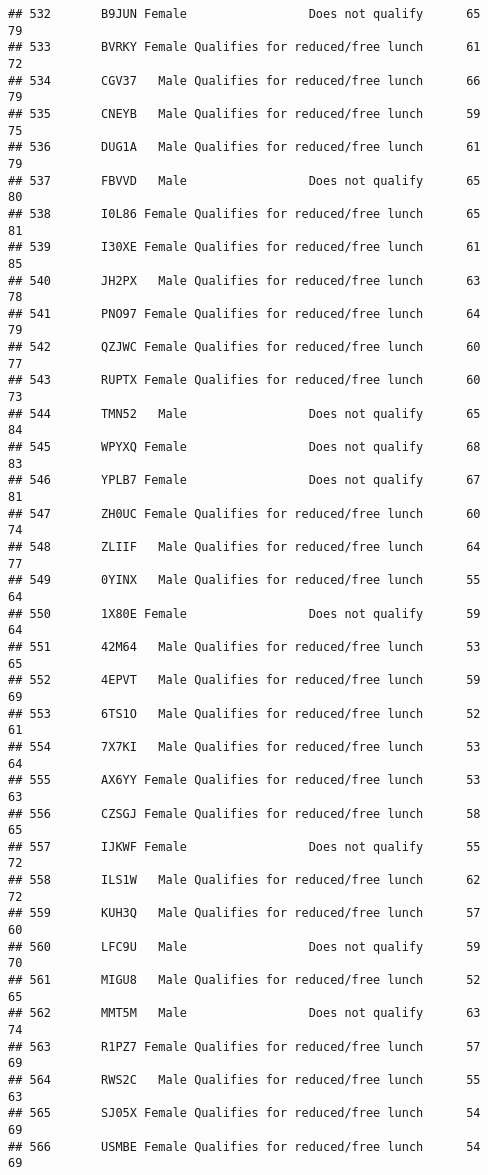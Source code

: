 \documentclass[
]{article}
\begin{document}
\begin{verbatim}
## 532       B9JUN Female                 Does not qualify      65       79
## 533       BVRKY Female Qualifies for reduced/free lunch      61       72
## 534       CGV37   Male Qualifies for reduced/free lunch      66       79
## 535       CNEYB   Male Qualifies for reduced/free lunch      59       75
## 536       DUG1A   Male Qualifies for reduced/free lunch      61       79
## 537       FBVVD   Male                 Does not qualify      65       80
## 538       I0L86 Female Qualifies for reduced/free lunch      65       81
## 539       I30XE Female Qualifies for reduced/free lunch      61       85
## 540       JH2PX   Male Qualifies for reduced/free lunch      63       78
## 541       PNO97 Female Qualifies for reduced/free lunch      64       79
## 542       QZJWC Female Qualifies for reduced/free lunch      60       77
## 543       RUPTX Female Qualifies for reduced/free lunch      60       73
## 544       TMN52   Male                 Does not qualify      65       84
## 545       WPYXQ Female                 Does not qualify      68       83
## 546       YPLB7 Female                 Does not qualify      67       81
## 547       ZH0UC Female Qualifies for reduced/free lunch      60       74
## 548       ZLIIF   Male Qualifies for reduced/free lunch      64       77
## 549       0YINX   Male Qualifies for reduced/free lunch      55       64
## 550       1X80E Female                 Does not qualify      59       64
## 551       42M64   Male Qualifies for reduced/free lunch      53       65
## 552       4EPVT   Male Qualifies for reduced/free lunch      59       69
## 553       6TS1O   Male Qualifies for reduced/free lunch      52       61
## 554       7X7KI   Male Qualifies for reduced/free lunch      53       64
## 555       AX6YY Female Qualifies for reduced/free lunch      53       63
## 556       CZSGJ Female Qualifies for reduced/free lunch      58       65
## 557       IJKWF Female                 Does not qualify      55       72
## 558       ILS1W   Male Qualifies for reduced/free lunch      62       72
## 559       KUH3Q   Male Qualifies for reduced/free lunch      57       60
## 560       LFC9U   Male                 Does not qualify      59       70
## 561       MIGU8   Male Qualifies for reduced/free lunch      52       65
## 562       MMT5M   Male                 Does not qualify      63       74
## 563       R1PZ7 Female Qualifies for reduced/free lunch      57       69
## 564       RWS2C   Male Qualifies for reduced/free lunch      55       63
## 565       SJ05X Female Qualifies for reduced/free lunch      54       69
## 566       USMBE Female Qualifies for reduced/free lunch      54       69

\end{verbatim}
\end{document}
